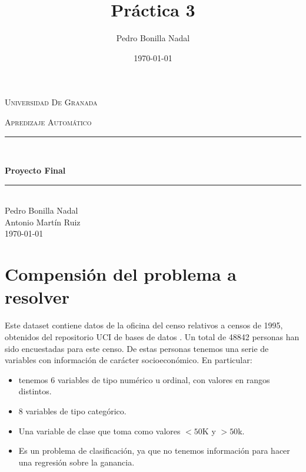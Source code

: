 \documentclass[11pt,a4paper]{article}
\title{Práctica 3}
\author{Pedro Bonilla Nadal}
\date{\today}
\begin{document}
\begin{titlepage}
\begin{center}

\vspace*{.06\textheight}
{\scshape\LARGE Universidad De Granada\par}\vspace{1.5cm} %
\textsc{\Large Apredizaje Automático}\\[0.5cm] %

\rule{\textwidth}{0.4mm} \\[0.4cm] %
{\huge \bfseries Proyecto Final\par}\vspace{0.4cm} %

\rule{\textwidth}{0.4mm} \\[11.5cm] %
 {\Large Pedro Bonilla Nadal\\Antonio Martín Ruiz}\\[1cm]

 {\today}

\vfill
\end{center}
\end{titlepage}

\setcounter{tocdepth}{2}
\tableofcontents
\newpage



\section{Compensión del problema a resolver }

Este dataset contiene datos de la oficina del censo\cite{census} relativos a censos de 1995, obtenidos del repositorio UCI de bases de datos \cite{uci}. Un total de 48842 personas han sido encuestadas para este censo. De estas personas tenemos una serie de variables con información de carácter socioeconómico. En particular:
\begin{itemize}
\item tenemos 6 variables de tipo numérico u ordinal, con valores en rangos distintos.
\item 8 variables de tipo categórico.
\item Una variable de clase que toma como valores $<50$K y $>50$k.
\item Es un problema de clasificación, ya que no tenemos información para hacer una regresión sobre la ganancia.
\end{itemize}
\end{document}
